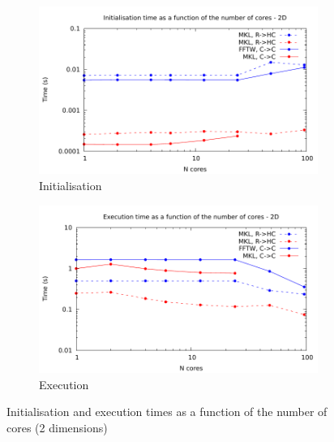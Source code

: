 \documentclass[12pt, a4paper]{article} \setlength{\textheight}{24cm}
\begin{document}
\begin{figure}[H]
  \captionsetup{width=0.8\linewidth}
  \centering
  \begin{subfigure}{.5\textwidth}
    \centering
    \includegraphics[width=.9\linewidth]{graphs/mpi-multh-init-2d.pdf}
    \caption{Initialisation}
    \label{2DMPIMULTHI}
  \end{subfigure}%
  \begin{subfigure}{.5\textwidth}
    \centering
    \includegraphics[width=.9\linewidth]{graphs/mpi-multh-exec-2d.pdf}
    \caption{Execution}
    \label{2DMPIMULTHE}
  \end{subfigure}
  \caption{Initialisation and execution times as a function of the
    number of cores (2 dimensions)}
  \label{2DMPIMULTH}
\end{figure}
\end{document}
